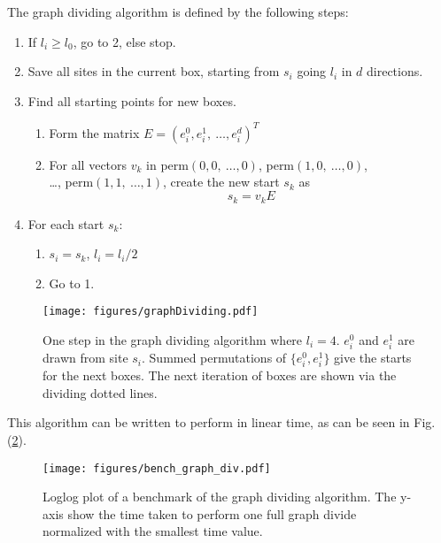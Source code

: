 The graph dividing algorithm is defined by the following steps:

\begin{enumerate}
    \item If $l_i \geq l_0$, go to 2, else stop.
%
    \item Save all sites in the current box, starting from $s_i$ going $l_i$ in $d$ directions.
%
    \item Find all starting points for new boxes.
%
    \begin{enumerate}[label=(\roman*)]
%
        \item Form the matrix $E = (e_i^0, e_i^1, \  \ldots, e_i^d)^T$
%
        \item For all vectors $v_k$ in perm$(0, 0, \ \ldots , 0)$, perm$(1, 0, \ \ldots , 0)$, \\ \ldots, perm$(1, 1, \ \ldots , 1)$, create the new start $s_k$ as $$s_k = v_k E$$
%
    \end{enumerate}
%
    \item For each start $s_k$:
    \begin{enumerate}[label=(\roman*)]
        \item $s_i = s_k$, $l_i = l_i / 2$
        \item Go to 1.
    \end{enumerate}
%
\end{enumerate}


\begin{figure}[h!]
    \centering
        \texttt{[image: figures/graphDividing.pdf]}
    \caption{One step in the graph dividing algorithm where $l_i = 4$. $e^0_i$ and $e^1_i$ are drawn from site $s_i$. Summed permutations of $\{e^0_i, e^1_i\}$ give the starts for the next boxes. The next iteration of boxes are shown via the dividing dotted lines.}
    \label{fig:graphdividingalgo}
\end{figure}

This algorithm can be written to perform in linear time, as can be seen in Fig. (\ref{fig:bench_graphdiv}). 

\begin{figure}[h!]
    \centering
        \texttt{[image: figures/bench\_graph\_div.pdf]}
    \caption{Loglog plot of a benchmark of the graph dividing algorithm. The y-axis show the time taken to perform one full graph divide normalized with the smallest time value.}
    \label{fig:bench_graphdiv}
\end{figure}

